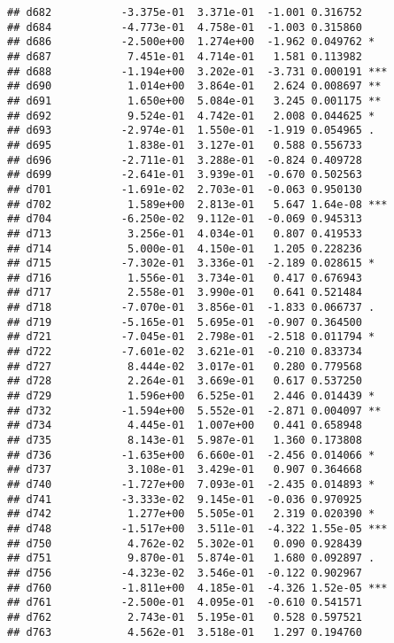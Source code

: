 \documentclass[
]{article}
\begin{document}
\begin{verbatim}
## d682           -3.375e-01  3.371e-01  -1.001 0.316752    
## d684           -4.773e-01  4.758e-01  -1.003 0.315860    
## d686           -2.500e+00  1.274e+00  -1.962 0.049762 *  
## d687            7.451e-01  4.714e-01   1.581 0.113982    
## d688           -1.194e+00  3.202e-01  -3.731 0.000191 ***
## d690            1.014e+00  3.864e-01   2.624 0.008697 ** 
## d691            1.650e+00  5.084e-01   3.245 0.001175 ** 
## d692            9.524e-01  4.742e-01   2.008 0.044625 *  
## d693           -2.974e-01  1.550e-01  -1.919 0.054965 .  
## d695            1.838e-01  3.127e-01   0.588 0.556733    
## d696           -2.711e-01  3.288e-01  -0.824 0.409728    
## d699           -2.641e-01  3.939e-01  -0.670 0.502563    
## d701           -1.691e-02  2.703e-01  -0.063 0.950130    
## d702            1.589e+00  2.813e-01   5.647 1.64e-08 ***
## d704           -6.250e-02  9.112e-01  -0.069 0.945313    
## d713            3.256e-01  4.034e-01   0.807 0.419533    
## d714            5.000e-01  4.150e-01   1.205 0.228236    
## d715           -7.302e-01  3.336e-01  -2.189 0.028615 *  
## d716            1.556e-01  3.734e-01   0.417 0.676943    
## d717            2.558e-01  3.990e-01   0.641 0.521484    
## d718           -7.070e-01  3.856e-01  -1.833 0.066737 .  
## d719           -5.165e-01  5.695e-01  -0.907 0.364500    
## d721           -7.045e-01  2.798e-01  -2.518 0.011794 *  
## d722           -7.601e-02  3.621e-01  -0.210 0.833734    
## d727            8.444e-02  3.017e-01   0.280 0.779568    
## d728            2.264e-01  3.669e-01   0.617 0.537250    
## d729            1.596e+00  6.525e-01   2.446 0.014439 *  
## d732           -1.594e+00  5.552e-01  -2.871 0.004097 ** 
## d734            4.445e-01  1.007e+00   0.441 0.658948    
## d735            8.143e-01  5.987e-01   1.360 0.173808    
## d736           -1.635e+00  6.660e-01  -2.456 0.014066 *  
## d737            3.108e-01  3.429e-01   0.907 0.364668    
## d740           -1.727e+00  7.093e-01  -2.435 0.014893 *  
## d741           -3.333e-02  9.145e-01  -0.036 0.970925    
## d742            1.277e+00  5.505e-01   2.319 0.020390 *  
## d748           -1.517e+00  3.511e-01  -4.322 1.55e-05 ***
## d750            4.762e-02  5.302e-01   0.090 0.928439    
## d751            9.870e-01  5.874e-01   1.680 0.092897 .  
## d756           -4.323e-02  3.546e-01  -0.122 0.902967    
## d760           -1.811e+00  4.185e-01  -4.326 1.52e-05 ***
## d761           -2.500e-01  4.095e-01  -0.610 0.541571    
## d762            2.743e-01  5.195e-01   0.528 0.597521    
## d763            4.562e-01  3.518e-01   1.297 0.194760    

\end{verbatim}
\end{document}
